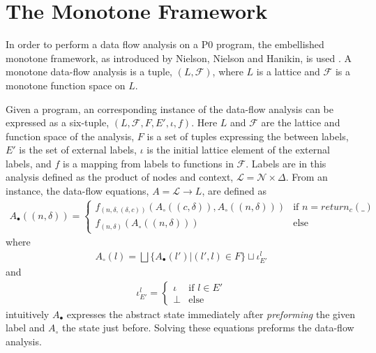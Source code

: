 \section{The Monotone Framework}
\label{sec:framework}
In order to perform a data flow analysis on a P0 program, the embellished monotone framework, as introduced by Nielson, Nielson and Hanikin, is used . A monotone data-flow analysis is a tuple, $(L, \mathcal{F})$, where $L$ is a lattice and $\mathcal{F}$ is a monotone function space on $L$.

Given a program, an corresponding instance of the data-flow analysis can be expressed as a six-tuple, $(L, \mathcal{F}, F, E', \iota, f)$. Here $L$ and $\mathcal{F}$ are the lattice and function space of the analysis, $F$ is a set of tuples expressing the between labels, $E'$ is the set of external labels, $\iota$ is the initial lattice element of the external labels, and $f$ is a mapping from labels to functions in $\mathcal{F}$. Labels are in this analysis defined as the product of nodes and context, $\mathcal{L} = \mathcal{N}\times \Delta$. From an instance, the data-flow equations, $A = \mathcal{L} \rightarrow L$, are defined as
\begin{align}
	A_\bullet ((n, \delta)) = \begin{cases} 
		f_{(n, \delta, (\delta, c))}(A_\circ(( c, \delta)), A_\circ((n, \delta))) &\text{if $n=\mathit{return}_c(\_)$}\\
		f_{(n, \delta)}(A_\circ((n, \delta)))& \text{else}
		\end{cases}
\end{align}
where 
\begin{align}
	A_\circ (l) = \bigsqcup \{A_\bullet(l') | (l', l) \in F\} \sqcup \iota_{E'}^l
\end{align}
and
\begin{align}
\iota_{E'}^l = \begin{cases} \iota & \text{if }l\in E' \\  \bot &\text{else} \end{cases}
\end{align}
intuitively $A_\bullet$ expresses the abstract state immediately after \emph{preforming} the given label and $A_\circ$ the state just before. Solving these equations preforms the data-flow analysis. 

